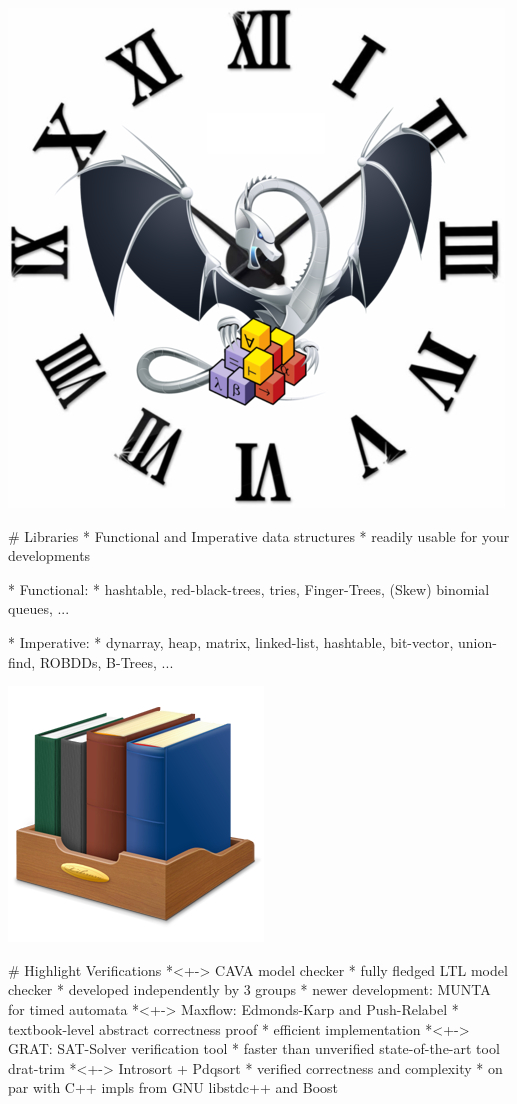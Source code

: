 \documentclass[fleqn]{beamer}
\begin{document}
  \includegraphics[height=.5\textheight]{isabelle-llvm-time.png}

# Libraries
  * Functional and Imperative data structures
    * readily usable for your developments

  * Functional:
    * hashtable, red-black-trees, tries, Finger-Trees, (Skew) binomial queues, ...

  * Imperative:
    * dynarray, heap, matrix, linked-list, hashtable, bit-vector, union-find, ROBDDs, B-Trees, ...

  \includegraphics[height=.2\textheight]{books.png}


# Highlight Verifications
  *<+-> CAVA model checker
    * fully fledged LTL model checker
    * developed independently by 3 groups
    * newer development: MUNTA for timed automata
  *<+-> Maxflow: Edmonds-Karp and Push-Relabel
    * textbook-level abstract correctness proof
    * efficient implementation
  *<+-> GRAT: SAT-Solver verification tool
    * faster than unverified state-of-the-art tool drat-trim
  *<+-> Introsort + Pdqsort
    * verified correctness and complexity
    * on par with C++ impls from GNU libstdc++ and Boost
\end{document}
